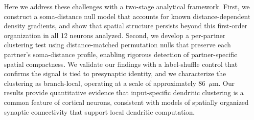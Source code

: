 Here we address these challenges with a two-stage analytical framework. First, we construct a soma-distance null model that accounts for known distance-dependent density gradients, and show that spatial structure persists beyond this first-order organization in all 12 neurons analyzed. Second, we develop a per-partner clustering test using distance-matched permutation nulls that preserve each partner's soma-distance profile, enabling rigorous detection of partner-specific spatial compactness. We validate our findings with a label-shuffle control that confirms the signal is tied to presynaptic identity, and we characterize the clustering as branch-local, operating at a scale of approximately 86~$\mu$m. Our results provide quantitative evidence that input-specific dendritic clustering is a common feature of cortical neurons, consistent with models of spatially organized synaptic connectivity that support local dendritic computation.
